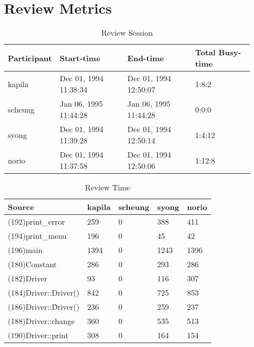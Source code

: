 \section{Review Metrics}
\begin{table}[hb]
\begin{center}
\begin{tabular}{|l|l|l|l|}
\hline
Participant & Start-time & End-time & Total Busy-time \\
\hline
kapila & Dec 01, 1994 11:38:34 & Dec 01, 1994 12:50:07 & 1:8:2 \\
scheung & Jan 06, 1995 11:44:28 & Jan 06, 1995 11:44:28 & 0:0:0 \\
syong & Dec 01, 1994 11:39:28 & Dec 01, 1994 12:50:14 & 1:4:12 \\
norio & Dec 01, 1994 11:37:58 & Dec 01, 1994 12:50:06 & 1:12:8 \\
\hline
\end{tabular}
\end{center}
\caption{Review Session}
\end{table}


\begin{table}[hb]
\begin{center}
\begin{tabular}{|l|l|l|l|l|}
\hline
Source & kapila & scheung & syong & norio\\
\hline
(192)print\_error & 259 & 0 & 388 & 411\\
(194)print\_menu & 196 & 0 & 45 & 42\\
(196)main & 1394 & 0 & 1243 & 1396\\
(180)Constant & 286 & 0 & 293 & 286\\
(182)Driver & 93 & 0 & 116 & 307\\
(184)Driver::Driver() & 842 & 0 & 725 & 853\\
(186)Driver::\~Driver() & 236 & 0 & 259 & 237\\
(188)Driver::change & 360 & 0 & 535 & 513\\
(190)Driver::print & 308 & 0 & 164 & 154\\
\hline
\end{tabular}
\end{center}
\caption{Review Time}
\end{table}



